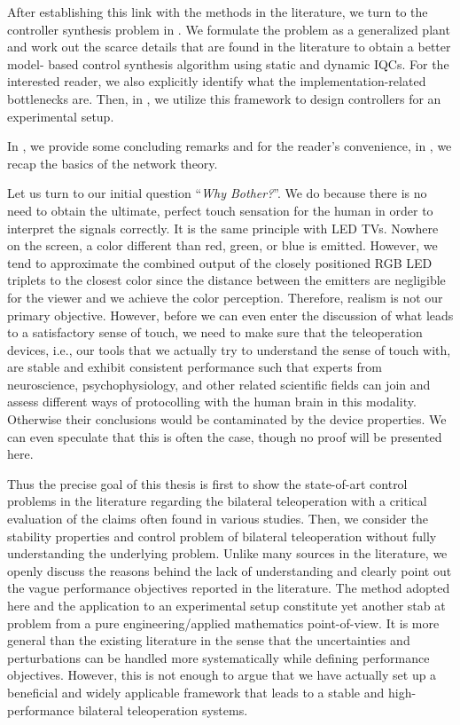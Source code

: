 After establishing this link with the methods in the literature, we turn to the controller synthesis problem in . We 
formulate the problem as a generalized plant and work out the scarce details that are found in the literature to obtain a better model-
based control synthesis algorithm using static and dynamic IQCs. For the interested reader, we also explicitly identify what the 
implementation-related bottlenecks are. Then, in , we utilize this framework to design controllers for an experimental 
setup.

In , we provide some concluding remarks and for the reader's convenience, in , we recap the basics 
of the network theory.

Let us turn to our initial question \enquote{\emph{Why Bother?}}. We do because there is no need to obtain the ultimate, perfect touch sensation for 
the human in order to interpret the signals correctly. It is the same principle with LED TVs. Nowhere on the screen, a color different 
than red, green, or blue is emitted. However, we tend to approximate the combined output of the closely positioned RGB LED triplets to 
the closest color since the distance between the emitters are negligible for the viewer and we achieve the color perception. Therefore, 
realism is not our primary objective. However, before we can even enter the discussion of what leads to a satisfactory sense of touch, 
we need to make sure that the teleoperation devices, i.e., our tools that we actually try to understand the sense of touch with, are 
stable and exhibit consistent performance such that experts from neuroscience, psychophysiology, and other related scientific fields can 
join and assess different ways of protocolling with the human brain in this modality. Otherwise their conclusions would be contaminated 
by the device properties. We can even speculate that this is often the case, though no proof will be presented here.  


Thus the precise goal of this thesis is first to show the state-of-art control problems in the literature regarding the bilateral 
teleoperation with a critical evaluation of the claims often found in various studies. Then, we consider the stability properties and 
control problem of bilateral teleoperation without fully understanding the underlying problem. Unlike many sources in the literature, we 
openly discuss the reasons behind the lack of understanding and clearly point out the vague performance objectives reported in the 
literature. The method adopted here and the application to an experimental setup constitute yet another stab at problem from a pure 
engineering/applied mathematics point-of-view. It is more general than the existing literature in the sense that the uncertainties and 
perturbations can be handled more systematically while defining performance objectives. However, this is not enough to argue that we have 
actually set up a beneficial and widely applicable framework that leads to a stable and high-performance bilateral teleoperation systems. 
